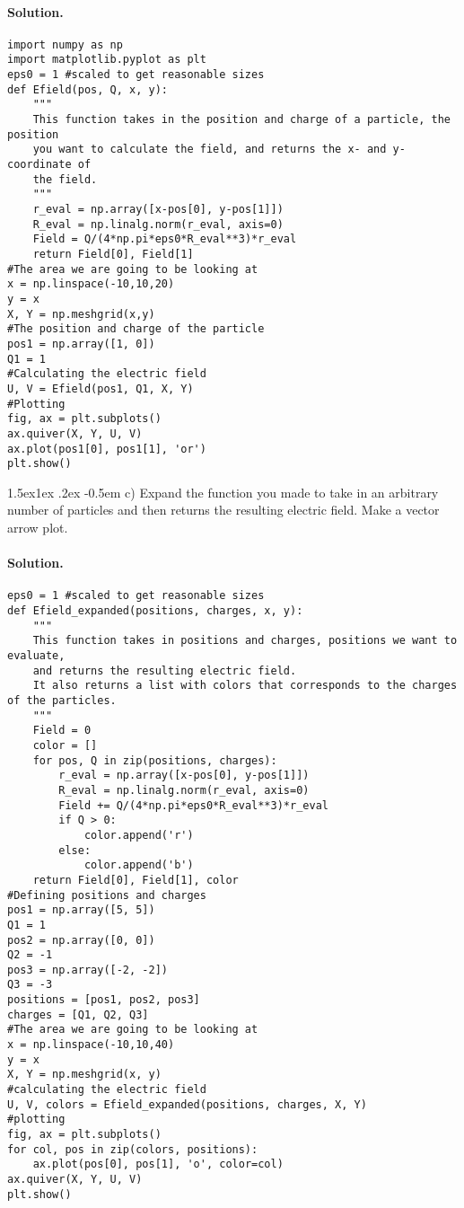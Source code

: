 \documentclass[%
oneside,                 %
final,                   %
10pt]{article}
\makeatletter
\newenvironment{doconceexercise}{}{}
\newcommand\subex{\@startsection{paragraph}{4}{\z@}%
                  {1.5ex\@plus1ex \@minus.2ex}%
                  {-0.5em}%
                  {\normalfont\normalsize\bfseries}}
\makeatother
\begin{document}
\begin{doconceexercise}


\paragraph{Solution.}
\begin{verbatim}
import numpy as np
import matplotlib.pyplot as plt
eps0 = 1 #scaled to get reasonable sizes
def Efield(pos, Q, x, y):
    """
    This function takes in the position and charge of a particle, the position
    you want to calculate the field, and returns the x- and y-coordinate of
    the field.
    """
    r_eval = np.array([x-pos[0], y-pos[1]])
    R_eval = np.linalg.norm(r_eval, axis=0)
    Field = Q/(4*np.pi*eps0*R_eval**3)*r_eval
    return Field[0], Field[1]
#The area we are going to be looking at
x = np.linspace(-10,10,20)
y = x
X, Y = np.meshgrid(x,y)
#The position and charge of the particle
pos1 = np.array([1, 0])
Q1 = 1
#Calculating the electric field
U, V = Efield(pos1, Q1, X, Y)
#Plotting
fig, ax = plt.subplots()
ax.quiver(X, Y, U, V)
ax.plot(pos1[0], pos1[1], 'or')
plt.show()
\end{verbatim}


\subex{c)}
Expand the function you made to take in an arbitrary number of particles and then returns the resulting electric field. Make a vector arrow plot.


\paragraph{Solution.}
\begin{verbatim}
eps0 = 1 #scaled to get reasonable sizes
def Efield_expanded(positions, charges, x, y):
    """
    This function takes in positions and charges, positions we want to evaluate,
    and returns the resulting electric field.
    It also returns a list with colors that corresponds to the charges of the particles.
    """
    Field = 0
    color = []
    for pos, Q in zip(positions, charges):
        r_eval = np.array([x-pos[0], y-pos[1]])
        R_eval = np.linalg.norm(r_eval, axis=0)
        Field += Q/(4*np.pi*eps0*R_eval**3)*r_eval
        if Q > 0:
            color.append('r')
        else:
            color.append('b')
    return Field[0], Field[1], color
#Defining positions and charges
pos1 = np.array([5, 5])
Q1 = 1
pos2 = np.array([0, 0])
Q2 = -1
pos3 = np.array([-2, -2])
Q3 = -3
positions = [pos1, pos2, pos3]
charges = [Q1, Q2, Q3]
#The area we are going to be looking at
x = np.linspace(-10,10,40)
y = x
X, Y = np.meshgrid(x, y)
#calculating the electric field
U, V, colors = Efield_expanded(positions, charges, X, Y)
#plotting
fig, ax = plt.subplots()
for col, pos in zip(colors, positions):
    ax.plot(pos[0], pos[1], 'o', color=col)
ax.quiver(X, Y, U, V)
plt.show()
\end{verbatim}


\end{doconceexercise}



\end{document}
